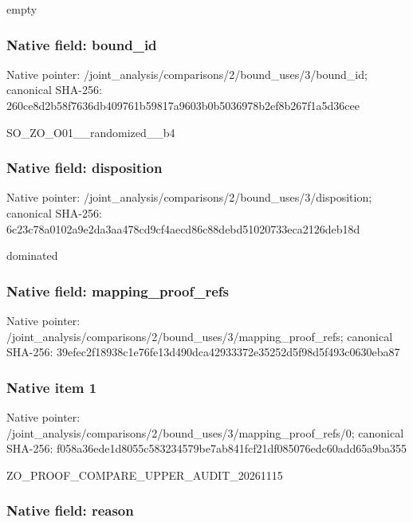 \documentclass[10pt,a4paper]{article}
\begin{document}
empty


\subsubsection{Native field: bound\_id}


Native pointer: /joint\_analysis/comparis\allowbreak{}ons/2/bound\_uses/3/bound\allowbreak{}\_id; canonical SHA-256: 260ce8d2b58f7636db409761\allowbreak{}b59817a9603b0b5036978b2e\allowbreak{}f8b267f1a5d36cee


SO\_ZO\_O01\_\_randomized\_\_b4


\subsubsection{Native field: disposition}


Native pointer: /joint\_analysis/comparis\allowbreak{}ons/2/bound\_uses/3/dispo\allowbreak{}sition; canonical SHA-256: 6c23c78a0102a9e2da3aa478\allowbreak{}cd9cf4aecd86c88debd51020\allowbreak{}733eca2126deb18d


dominated


\subsubsection{Native field: mapping\_proof\_refs}


Native pointer: /joint\_analysis/comparis\allowbreak{}ons/2/bound\_uses/3/mappi\allowbreak{}ng\_proof\_refs; canonical SHA-256: 39efec2f18938c1e76fe13d4\allowbreak{}90dca42933372e35252d5f98\allowbreak{}d5f493c0630eba87



\subsubsection{Native item 1}


Native pointer: /joint\_analysis/comparis\allowbreak{}ons/2/bound\_uses/3/mappi\allowbreak{}ng\_proof\_refs/0; canonical SHA-256: f058a36ede1d8055c5832345\allowbreak{}79be7ab841fcf21df085076e\allowbreak{}dc60add65a9ba355


ZO\_PROOF\_COMPARE\_UPPER\_AUDIT\_20261115


\subsubsection{Native field: reason}
\end{document}
